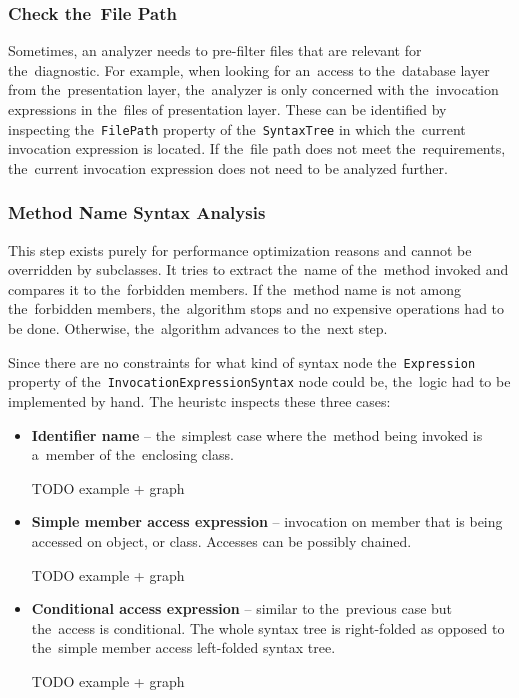 \documentclass[
  digital, %
  table,   %
  lof,     %
  lot,     %
  oneside,
]{fithesis3}
\begin{document}
\subsubsection{\textbf{Check the~File Path}}
Sometimes, an analyzer needs to pre-filter files that are relevant for the~diagnostic. For example, when looking for an~access to the~database layer from the~presentation layer, the~analyzer is only concerned with the~invocation expressions in the~files of presentation layer. These can be identified by inspecting the~\texttt{FilePath} property of the~\texttt{SyntaxTree} in which the~current invocation expression is located. If the~file path does not meet the~requirements, the~current invocation expression does not need to be analyzed further.

\subsubsection{\textbf{Method Name Syntax Analysis}}
This step exists purely for performance optimization reasons and cannot be overridden by subclasses. It tries to extract the~name of the~method invoked and compares it to the~forbidden members. If the~method name is not among the~forbidden members, the~algorithm stops and no expensive operations had to be done. Otherwise, the~algorithm advances to the~next step.

Since there are no constraints for what kind of syntax node the~\texttt{Expression} property of the~\texttt{InvocationExpressionSyntax} node could be, the~logic had to be implemented by hand. The heuristc inspects these three cases:
\begin{itemize}
  \item \textbf{Identifier name} -- the~simplest case where the~method being invoked is a~member of the~enclosing class.

  TODO example + graph
  
  \item \textbf{Simple member access expression} -- invocation on member that is being accessed on object, or class. Accesses can be possibly chained.
  
  TODO example + graph 
    
  \item \textbf{Conditional access expression} -- similar to the~previous case but the~access is conditional. The whole syntax tree is right-folded as opposed to the~simple member access left-folded syntax tree.
  
  TODO example + graph
  
\end{itemize} 
\end{document}
